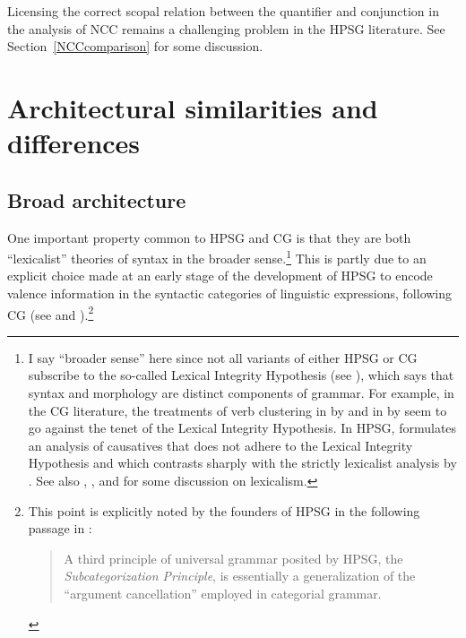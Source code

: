 \documentclass[output=paper
                ,modfonts
 	        ,biblatex
                ,babelshorthands
                ,newtxmath
                ,draftmode
                ,colorlinks, citecolor=brown
]{langscibook}
\begin{document}
Licensing the correct scopal relation between the quantifier and
conjunction in the analysis of NCC remains a challenging problem in
the HPSG literature. See Section~\ref{NCCcomparison} for some
discussion.

\section{Architectural similarities and differences \label{architecture}}

\subsection{Broad architecture}

One important property common to HPSG and CG is that they are both
``lexicalist'' theories of syntax in the broader sense.\footnote{I say
``broader sense'' here since not all variants of either HPSG or CG subscribe to the
so-called Lexical Integrity Hypothesis (see 
), which says that syntax and 
morphology are distinct components of grammar. For example, in the CG literature, 
the treatments of verb clustering in  by \citet{moortgatoehrle94} and
in  by \citet{Kubota2014a-u} seem to go against the tenet of
the Lexical Integrity Hypothesis. In HPSG,
\citet{Gunji99a-u} formulates an analysis of 
causatives that does not adhere to the Lexical Integrity Hypothesis and which 
contrasts sharply with the strictly lexicalist analysis by 
\citet{MSI99a}. 
See also , 
\citet{Bruening2018a, Bruening2018c-u}, \citet{MuellerLexicalism} and \citet{MWArgSt}
for some discussion on lexicalism.} 
This is partly due to an explicit choice made at an early
stage of the development of HPSG to encode valence information in the
syntactic categories of linguistic expressions, following CG
(see \crossrefchapteralt[\pageref{page-subcategorization-start}--\pageref{page-subcategorization-start}]{evolution} and ).\footnote{This
  point is explicitly noted by the founders of HPSG
  in the following passage in \citet{ps}:

\begin{quote}
A third principle of universal grammar posited by HPSG, the
\textit{Subcategorization Principle}, is essentially a generalization of the
``argument cancellation'' employed in categorial grammar. \hfill \citep[11]{ps}
\end{quote}

}
\end{document}

